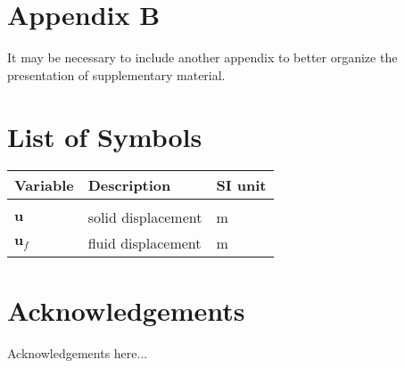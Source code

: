 \documentclass{Configuration_Files/PoliMi3i_thesis}
\begin{document}
    \chapter{Appendix B}
    It may be necessary to include another appendix to better organize the presentation of supplementary material.

    \listoffigures

    \listoftables

    \chapter*{List of Symbols} %
    \begin{table}[H]
        \centering
        \begin{tabular}{lll}
            \textbf{Variable} & \textbf{Description} & \textbf{SI unit} \\\hline\\[-9px]
            $\bm{u}$        & solid displacement   & m \\[2px]
            $\bm{u}_f$        & fluid displacement   & m \\[2px]
        \end{tabular}
    \end{table}

    \chapter*{Acknowledgements}
    Acknowledgements here...

    \cleardoublepage
\end{document}
